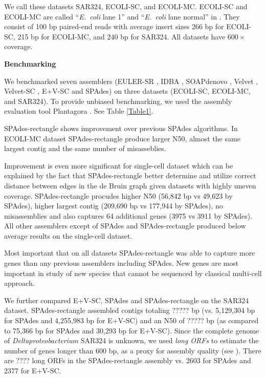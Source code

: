 \documentclass[a4paper]{article}
\def\ecoli{\emph{E.~coli}}
\def\spades{SPAdes}
\begin{document}
We call these datasets SAR324, ECOLI-SC, and ECOLI-MC.
ECOLI-SC and ECOLI-MC are called ``{\ecoli} lane 1'' and ``{\ecoli} lane normal'' in \cite{Chitsaz2011}.
They consist of 100 bp paired-end reads
with average insert sizes 266 bp for ECOLI-SC, 215 bp for ECOLI-MC,
and 240 bp for SAR324.
All datasets have $600\times$ coverage.

\textbf{Benchmarking}

We benchmarked seven assemblers
(EULER-SR \cite{Chaisson08}, IDBA \cite{Peng10}, SOAPdenovo \cite{Li10}, Velvet \cite{Zerbino08}, Velvet-SC \cite{Chitsaz2011}, E+V-SC \cite{Chitsaz2011} and {\spades}) on three datasets
(ECOLI-SC, ECOLI-MC, and SAR324). To provide unbiased
benchmarking, we used the assembly evaluation tool Plantagora \cite{Barthelson2011}. See Table \ref{Table1}.

{\spades}-rectangle shows improvement over previous SPAdes algorithms. In ECOLI-MC dataset {\spades}-rectangle produce larger N50, almost the same largest contig and the same number of misasseblies.

Improvement is even more significant for single-cell dataset which can be explained by the fact that {\spades}-rectangle better determine and utilize correct distance between edges in the de Bruin graph given datasets with highly uneven coverage. {\spades}-rectangle procudes higher N50 (56,842 bp vs 49,623 by {\spades}), higher largest contig (209,690 bp vs 177,944 by {\spades}), no misassemblies and also captures 64 additional genes (3975 vs 3911 by {\spades}). All other assemblers except of {\spades} and {\spades}-rectangle produced below average results on the single-cell dataset.

Most important that on all datasets {\spades}-rectangle was able to capture more genes than any previous assemblers including {\spades}. New genes are most important in study of new species that cannot be sequenced by classical multi-cell approach.

We further compared E+V-SC, {\spades} and {\spades}-rectangle on the SAR324 dataset.
{\spades}-rectangle assembled contigs totaling ????? bp
(vs. 5,129,304 bp for {\spades} and 4,255,983 bp for E+V-SC) and an N50 of ????? bp (as compared to 75,366 bp for {\spades} and 30,293 bp for E+V-SC).
Since the complete genome of \emph{Deltaproteobacterium} SAR324 is unknown,
we used {\em long ORFs} to estimate the number of genes longer than 600 bp, as a proxy for assembly quality (see \cite{Chitsaz2011}).
There are ???? long ORFs in the {\spades}-rectangle assembly
vs. 2603 for {\spades} and 2377 for E+V-SC.
\end{document}
